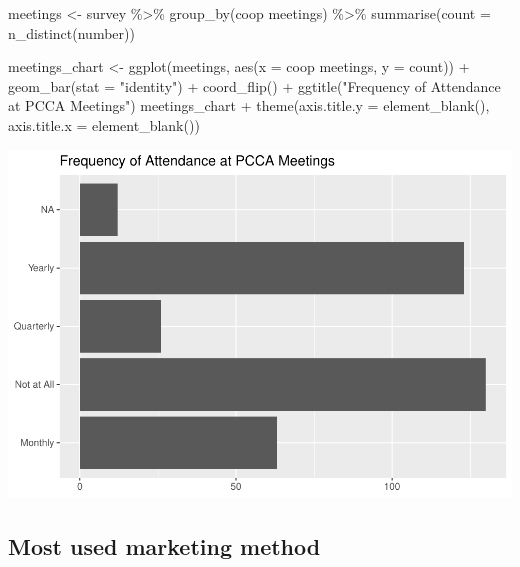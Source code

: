 \documentclass[
]{article}
\newenvironment{Shaded}{\begin{snugshade}}{\end{snugshade}}
\newcommand{\AttributeTok}[1]{\textcolor[rgb]{0.77,0.63,0.00}{#1}}
\newcommand{\FunctionTok}[1]{\textcolor[rgb]{0.00,0.00,0.00}{#1}}
\newcommand{\NormalTok}[1]{#1}
\newcommand{\OtherTok}[1]{\textcolor[rgb]{0.56,0.35,0.01}{#1}}
\newcommand{\SpecialCharTok}[1]{\textcolor[rgb]{0.00,0.00,0.00}{#1}}
\newcommand{\StringTok}[1]{\textcolor[rgb]{0.31,0.60,0.02}{#1}}
\begin{document}
\begin{Shaded}
\begin{Highlighting}[]
\NormalTok{meetings }\OtherTok{\textless{}{-}}\NormalTok{ survey }\SpecialCharTok{\%\textgreater{}\%}
    \FunctionTok{group\_by}\NormalTok{(}\StringTok{\textasciigrave{}}\AttributeTok{coop meetings}\StringTok{\textasciigrave{}}\NormalTok{) }\SpecialCharTok{\%\textgreater{}\%}
    \FunctionTok{summarise}\NormalTok{(}\AttributeTok{count =} \FunctionTok{n\_distinct}\NormalTok{(number))}

\NormalTok{meetings\_chart }\OtherTok{\textless{}{-}} \FunctionTok{ggplot}\NormalTok{(meetings, }\FunctionTok{aes}\NormalTok{(}\AttributeTok{x =} \StringTok{\textasciigrave{}}\AttributeTok{coop meetings}\StringTok{\textasciigrave{}}\NormalTok{, }\AttributeTok{y =}\NormalTok{ count)) }\SpecialCharTok{+}
    \FunctionTok{geom\_bar}\NormalTok{(}\AttributeTok{stat =} \StringTok{"identity"}\NormalTok{) }\SpecialCharTok{+} \FunctionTok{coord\_flip}\NormalTok{() }\SpecialCharTok{+} \FunctionTok{ggtitle}\NormalTok{(}\StringTok{"Frequency of Attendance at PCCA Meetings"}\NormalTok{)}
\NormalTok{meetings\_chart }\SpecialCharTok{+} \FunctionTok{theme}\NormalTok{(}\AttributeTok{axis.title.y =} \FunctionTok{element\_blank}\NormalTok{(), }\AttributeTok{axis.title.x =} \FunctionTok{element\_blank}\NormalTok{())}
\end{Highlighting}
\end{Shaded}

\includegraphics{pcca_survey_files/figure-latex/meetings-all-1.pdf}

\hypertarget{most-used-marketing-method}{%
\subsection{Most used marketing
method}\label{most-used-marketing-method}}
\end{document}
